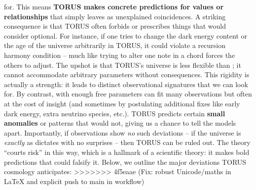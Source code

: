 \documentclass[]{article}
\begin{document}
for​. This means \textbf{TORUS makes concrete predictions for values or
relationships} that  simply leaves as unexplained coincidences. A
striking consequence is that TORUS often forbids or prescribes things
that  would consider optional. For instance, if one tries to change
the dark energy content or the age of the universe arbitrarily in TORUS,
it could violate a recursion harmony condition -- much like trying to
alter one note in a chord forces the others to adjust. The upshot is
that TORUS's universe is less flexible than ; it cannot accommodate
arbitrary parameters without consequences. This rigidity is actually a
strength: it leads to distinct observational signatures that we can look
for. By contrast,  with enough free parameters can fit many
observations but often at the cost of insight (and sometimes by
postulating additional fixes like early dark energy, extra neutrino
species, etc.). TORUS predicts certain \textbf{small anomalies} or
patterns that  would not, giving us a chance to tell the models
apart. Importantly, if observations show \emph{no} such deviations -- if
the universe is \emph{exactly} as  dictates with no surprises --
then TORUS can be ruled out. The theory ``courts risk'' in this way​,
which is a hallmark of a scientific theory: it makes bold predictions
that could falsify it. Below, we outline the major deviations TORUS
cosmology anticipates:
>>>>>>> 4f5eaae (Fix: robust Unicode/maths in LaTeX and explicit push to main in workflow)
\end{document}
